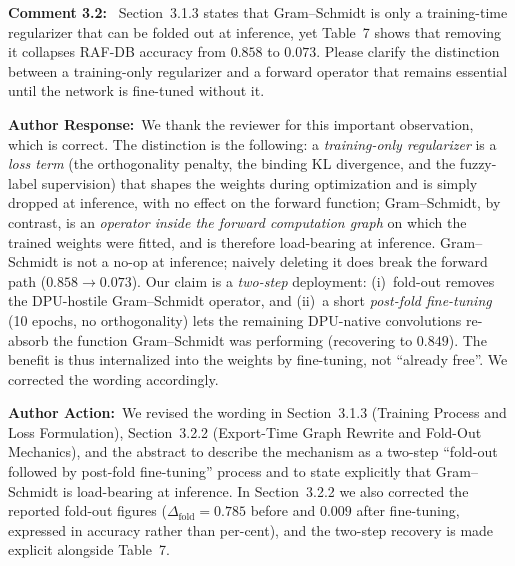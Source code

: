\documentclass[11pt]{article}
\newcommand{\comment}[1]{\smallskip\noindent\textbf{\color{navy}Comment #1:}\ }
\newcommand{\response}{\smallskip\par\noindent\textbf{\color{steel}Author Response:}\ }
\newcommand{\action}{\smallskip\par\noindent\textbf{\color{steel}Author Action:}\ }
\begin{document}
\comment{3.2} Section~3.1.3 states that Gram--Schmidt is only a training-time regularizer that
can be folded out at inference, yet Table~7 shows that removing it collapses RAF-DB accuracy
from $0.858$ to $0.073$. Please clarify the distinction between a training-only regularizer
and a forward operator that remains essential until the network is fine-tuned without it.
\response We thank the reviewer for this important observation, which is correct. The
distinction is the following: a \emph{training-only regularizer} is a \emph{loss term} (the
orthogonality penalty, the binding KL divergence, and the fuzzy-label supervision) that shapes
the weights during optimization and is simply dropped at inference, with no effect on the
forward function; Gram--Schmidt, by contrast, is an \emph{operator inside the forward
computation graph} on which the trained weights were fitted, and is therefore load-bearing at
inference.
Gram--Schmidt is not a no-op at inference; naively deleting it does break the forward path
($0.858\rightarrow0.073$). Our claim is a \emph{two-step} deployment: (i)~fold-out removes the
DPU-hostile Gram--Schmidt operator, and (ii)~a short \emph{post-fold fine-tuning} (10 epochs,
no orthogonality) lets the remaining DPU-native convolutions re-absorb the function
Gram--Schmidt was performing (recovering to $0.849$). The benefit is thus internalized into
the weights by fine-tuning, not ``already free''. We corrected the wording accordingly.
\action We revised the wording in Section~3.1.3 (Training Process and Loss Formulation),
Section~3.2.2 (Export-Time Graph Rewrite and Fold-Out Mechanics), and the abstract to describe
the mechanism as a two-step ``fold-out followed by post-fold fine-tuning'' process and to state
explicitly that Gram--Schmidt is load-bearing at inference. In Section~3.2.2 we also corrected
the reported fold-out figures ($\Delta_{\mathrm{fold}}=0.785$ before and $0.009$ after
fine-tuning, expressed in accuracy rather than per-cent), and the two-step recovery is made
explicit alongside Table~7.
\end{document}
